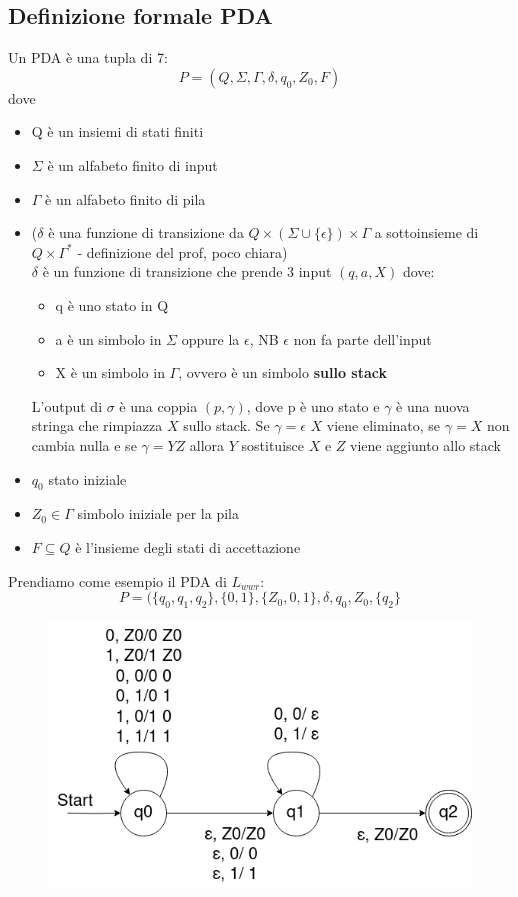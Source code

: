 \documentclass[12pt]{article}
\begin{document}
\subsection{Definizione formale PDA}
Un PDA è una tupla di 7:
\[ P = (Q,\Sigma, \Gamma, \delta, q_0, Z_0,F)\]
dove 
\begin{itemize}
  \item Q è un insiemi di stati finiti
  \item $\Sigma$ è un alfabeto finito di input
  \item $\Gamma$ è un alfabeto finito di pila
  \item ($\delta$ è una funzione di transizione da $Q\times(\Sigma \cup \{\epsilon\}) \times \Gamma$ a sottoinsieme di $Q \times \Gamma^*$ - definizione del prof, poco chiara)
    \\ $\delta$ è un funzione di transizione che prende 3 input $(q,a, X)$ dove: 
    \begin{itemize}
      \item q è uno stato in Q
      \item a è un simbolo in $\Sigma$ oppure la $\epsilon$, NB $\epsilon$ non fa parte dell'input
      \item X è un simbolo in $\Gamma$, ovvero è un simbolo \textbf{sullo stack}
    \end{itemize}
    L'output di $\sigma$ è una coppia $(p, \gamma)$, dove p è uno stato e $\gamma$ è una nuova stringa che rimpiazza $X$ sullo stack. 
    Se $\gamma = \epsilon$ $X$ viene eliminato, se $\gamma = X$ non cambia nulla e se $\gamma = YZ$ allora $Y$ sostituisce $X$ e $Z$ viene aggiunto allo stack

  \item $q_0$ stato iniziale 
  \item $Z_0 \in \Gamma$ simbolo iniziale per la pila
  \item $F \subseteq Q$ è l'insieme degli stati di accettazione
\end{itemize}

\newpage
Prendiamo come esempio il PDA di $L_{wwr}$: 
\[P=(\{q_0, q_1, q_2\}, \{0,1\}, \{Z_0, 0, 1\}, \delta, q_0, Z_0, \{ q_2 \}\]

\begin{figure}[ht]
	\includegraphics[scale = 0.4]{media/pda_diag.png}
	\centering
\end{figure}
\end{document}
